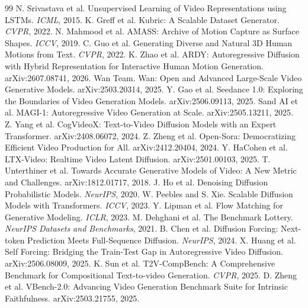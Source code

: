 \documentclass[10pt,twocolumn]{article}
\begin{document}
\balance
\begin{thebibliography}{99}\small
{} N. Srivastava et al. Unsupervised Learning of Video Representations using LSTMs. \emph{ICML}, 2015.
 K. Greff et al. Kubric: A Scalable Dataset Generator. \emph{CVPR}, 2022.
 N. Mahmood et al. AMASS: Archive of Motion Capture as Surface Shapes. \emph{ICCV}, 2019.
 C. Guo et al. Generating Diverse and Natural 3D Human Motions from Text. \emph{CVPR}, 2022.
 K. Zhao et al. ARDY: Autoregressive Diffusion with Hybrid Representation for Interactive Human Motion Generation. arXiv:2607.08741, 2026.
 Wan Team. Wan: Open and Advanced Large-Scale Video Generative Models. arXiv:2503.20314, 2025.
 Y. Gao et al. Seedance 1.0: Exploring the Boundaries of Video Generation Models. arXiv:2506.09113, 2025.
 Sand AI et al. MAGI-1: Autoregressive Video Generation at Scale. arXiv:2505.13211, 2025.
 Z. Yang et al. CogVideoX: Text-to-Video Diffusion Models with an Expert Transformer. arXiv:2408.06072, 2024.
 Z. Zheng et al. Open-Sora: Democratizing Efficient Video Production for All. arXiv:2412.20404, 2024.
 Y. HaCohen et al. LTX-Video: Realtime Video Latent Diffusion. arXiv:2501.00103, 2025.
 T. Unterthiner et al. Towards Accurate Generative Models of Video: A New Metric and Challenges. arXiv:1812.01717, 2018.
 J. Ho et al. Denoising Diffusion Probabilistic Models. \emph{NeurIPS}, 2020.
 W. Peebles and S. Xie. Scalable Diffusion Models with Transformers. \emph{ICCV}, 2023.
 Y. Lipman et al. Flow Matching for Generative Modeling. \emph{ICLR}, 2023.
 M. Dehghani et al. The Benchmark Lottery. \emph{NeurIPS Datasets and Benchmarks}, 2021.
 B. Chen et al. Diffusion Forcing: Next-token Prediction Meets Full-Sequence Diffusion. \emph{NeurIPS}, 2024.
 X. Huang et al. Self Forcing: Bridging the Train-Test Gap in Autoregressive Video Diffusion. arXiv:2506.08009, 2025.
 K. Sun et al. T2V-CompBench: A Comprehensive Benchmark for Compositional Text-to-video Generation. \emph{CVPR}, 2025.
 D. Zheng et al. VBench-2.0: Advancing Video Generation Benchmark Suite for Intrinsic Faithfulness. arXiv:2503.21755, 2025.
\end{thebibliography}
\end{document}
